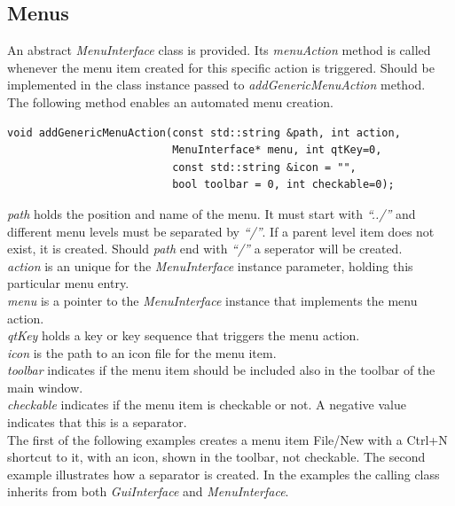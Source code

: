 \documentclass{article}
\begin{document}
\subsection{Menus}

An abstract \emph{MenuInterface} class is provided. Its \emph{menuAction} method is called whenever the menu item created for this specific action is triggered. Should be implemented in the class instance passed to \emph{addGenericMenuAction} method. \\

The following method enables an automated menu creation.

\begin{lstlisting}
void addGenericMenuAction(const std::string &path, int action,
                          MenuInterface* menu, int qtKey=0,
                          const std::string &icon = "",
                          bool toolbar = 0, int checkable=0);
\end{lstlisting}

\emph{path} holds the position and name of the menu. It must start with \emph{``../''} and different menu levels must be separated by \emph{``/''}. If a parent level item does not exist, it is created. Should \emph{path} end with \emph{``/''} a seperator will be created. \\

\emph{action} is an unique for the \emph{MenuInterface} instance parameter, holding this particular menu entry.\\

\emph{menu} is a pointer to the \emph{MenuInterface} instance that implements the menu action.\\

\emph{qtKey} holds a key or key sequence that triggers the menu action.\\

\emph{icon} is the path to an icon file for the menu item.\\

\emph{toolbar} indicates if the menu item should be included also in the toolbar of the main window.\\

\emph{checkable} indicates if the menu item is checkable or not. A negative value indicates that this is a separator.\\

The first of the following examples creates a menu item File/New with a Ctrl+N shortcut to it, with an icon, shown in the toolbar, not checkable. The second example illustrates how a separator is created. In the examples the calling class inherits from both \emph{GuiInterface} and \emph{MenuInterface}.
\end{document}
